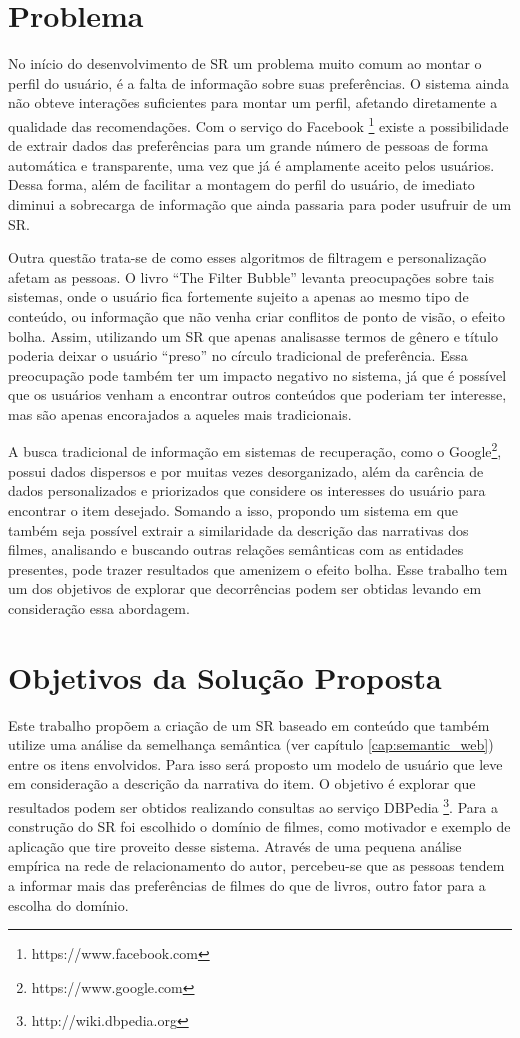 \section{Problema}
No início do desenvolvimento de SR um problema muito comum ao montar o perfil do usuário, é a falta de informação sobre suas preferências. O sistema ainda não obteve interações suficientes para montar um perfil, afetando diretamente a qualidade das recomendações. Com o serviço do Facebook \footnote{https://www.facebook.com} existe a possibilidade de extrair dados das preferências para um grande número de pessoas de forma automática e transparente, uma vez que já é amplamente aceito pelos usuários. Dessa forma, além de facilitar a montagem do perfil do usuário, de imediato diminui a sobrecarga de informação que ainda passaria para poder usufruir de um SR.

Outra questão trata-se de como esses algoritmos de filtragem e personalização afetam as pessoas. O livro “The Filter Bubble” \cite{Pariser:2011} levanta preocupações sobre tais sistemas, onde o usuário fica fortemente sujeito a apenas ao mesmo tipo de conteúdo, ou informação que não venha criar conflitos de ponto de visão, o efeito bolha. Assim, utilizando um SR que apenas analisasse termos de gênero e título poderia deixar o usuário “preso” no círculo tradicional de preferência. Essa preocupação pode também ter um impacto negativo no sistema, já que é possível que os usuários venham a encontrar outros conteúdos que poderiam ter interesse, mas são apenas encorajados a aqueles mais tradicionais. 

A busca tradicional de informação em sistemas de recuperação, como o Google\footnote{https://www.google.com}, possui dados dispersos e por muitas vezes desorganizado, além da carência de dados personalizados e priorizados que considere os interesses do usuário para encontrar o item desejado. Somando a isso, propondo um sistema em que também seja possível extrair a similaridade da descrição das narrativas dos filmes, analisando e buscando outras relações semânticas com as entidades presentes, pode trazer resultados que amenizem o efeito bolha. Esse trabalho tem um dos objetivos de explorar que decorrências podem ser obtidas levando em consideração essa abordagem.

\section{Objetivos da Solução Proposta}

Este trabalho propõem a criação de um SR baseado em conteúdo que também utilize uma análise da semelhança semântica (ver capítulo \ref{cap:semantic_web}) entre os itens envolvidos. Para isso será proposto um modelo de usuário que leve em consideração a descrição da narrativa do item. O objetivo é explorar que resultados podem ser obtidos realizando consultas ao serviço DBPedia \footnote{http://wiki.dbpedia.org}. Para a construção do SR foi escolhido o domínio de filmes, como motivador e exemplo de aplicação que tire proveito desse sistema. Através de uma pequena análise empírica na rede de relacionamento do autor, percebeu-se que as pessoas tendem a informar mais das preferências de filmes do que de livros, outro fator para a escolha do domínio.

